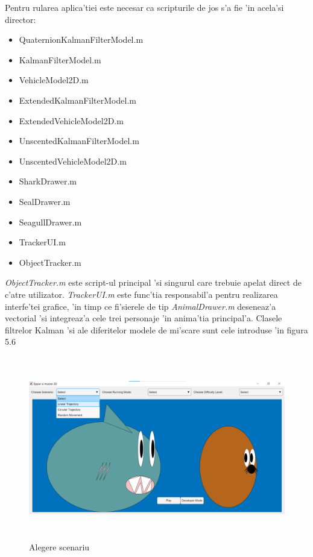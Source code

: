\documentclass[12pt,a4paper,twoside]{report}
\begin{document}
\vspace{5px}

Pentru rularea aplica'tiei este necesar ca scripturile de jos s'a fie 'in acela'si director:

\begin{itemize}
    \item QuaternionKalmanFilterModel.m
    \item KalmanFilterModel.m 
    \item VehicleModel2D.m 
    \item ExtendedKalmanFilterModel.m 
    \item ExtendedVehicleModel2D.m 
    \item UnscentedKalmanFilterModel.m 
    \item UnscentedVehicleModel2D.m 
    \item SharkDrawer.m 
    \item SealDrawer.m 
    \item SeagullDrawer.m 
    \item TrackerUI.m 
    \item ObjectTracker.m
\end{itemize}

\textit{ObjectTracker.m} este script-ul principal 'si singurul care trebuie apelat direct de c'atre utilizator. \textit{TrackerUI.m} este func'tia responsabil'a pentru realizarea interfe'tei grafice, 'in timp ce fi'sierele de tip \textit{AnimalDrawer.m} deseneaz'a vectorial 'si integreaz'a cele trei personaje 'in anima'tia principal'a. Clasele filtrelor Kalman 'si ale diferitelor modele de mi'scare sunt cele introduse 'in figura 5.6

\begin{figure}[H]
\centering
 \includegraphics[width=160mm,height=80mm,]{img/scenariujoc}
 \caption{Alegere scenariu}
\end{figure}
\end{document}
